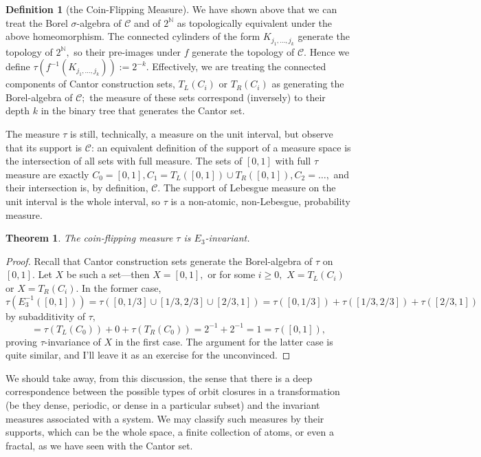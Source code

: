 \documentclass[12pt, letterpaper, oneside]{book}
\newcommand{\gs}{\ensuremath{\sigma}}
\newcommand{\gt}{\ensuremath{\tau}}
\newcommand{\N}{\mathbb{N}}
\theoremstyle{plain}
\newtheorem{theorem}{Theorem}
\theoremstyle{definition}
\newtheorem{definition}{Definition}
\theoremstyle{remark}
\begin{document}
\begin{definition}[the Coin-Flipping Measure]
We have shown above that we can treat the Borel $\gs$-algebra of $\mathcal{C}$ and of $2^\N$ as topologically equivalent under the above homeomorphism. The connected cylinders of the form $K_{j_1,\ldots,j_k}$ generate the topology of $2^\N,$ so their pre-images under $f$ generate the topology of $\mathcal{C}.$ Hence we define $\gt(f^{-1}(K_{j_1,\ldots,j_k})) := 2^{-k}.$ Effectively, we are treating the connected components of Cantor construction sets, $T_L(C_i)$ or $T_R(C_i)$ as generating the Borel-algebra of $\mathcal{C};$ the measure of these sets correspond (inversely) to their depth $k$ in the binary tree that generates the Cantor set. 

The measure $\gt$ is still, technically, a measure on the unit interval, but observe that its support is $\mathcal{C}$: an equivalent definition of the support of a measure space is the intersection of all sets with full measure. The sets of $[0,1]$ with full $\gt$ measure are exactly $C_0 = [0,1], C_1 = T_L([0,1]) \cup T_R([0,1]), C_2 = \ldots,$ and their intersection is, by definition, $\mathcal{C}.$ The support of Lebesgue measure on the unit interval is the whole interval, so $\gt$ is a non-atomic, non-Lebesgue, probability measure. 
\end{definition}

\begin{theorem}
The coin-flipping measure $\gt$ is $E_3$-invariant. 
\end{theorem}
\begin{proof}
Recall that Cantor construction sets generate the Borel-algebra of $\gt$ on $[0,1].$ Let $X$ be such a set---then $X=[0,1],$ or for some $i \geq 0,$ $X = T_L(C_i)$ or $X= T_R(C_i).$ In the former case, 
\[
\gt(E^{-1}_3([0,1])) = \gt([0,1/3] \cup [1/3, 2/3] \cup [2/3, 1]) = \gt([0, 1/3]) + \gt([1/3, 2/3]) + \gt([2/3, 1]) 
\]
by subadditivity of $\gt,$ 
\[
= \gt(T_L(C_0)) + 0 + \gt(T_R(C_0)) = 2^{-1} + 2^{-1} = 1 = \gt([0,1]),
\]
proving $\gt$-invariance of $X$ in the first case. The argument for the latter case is quite similar, and I'll leave it as an exercise for the unconvinced. 
\end{proof}

We should take away, from this discussion, the sense that there is a deep correspondence between the possible types of orbit closures in a transformation (be they dense, periodic, or dense in a particular subset) and the invariant measures associated with a system. We may classify such measures by their supports, which can be the whole space, a finite collection of atoms, or even a fractal, as we have seen with the Cantor set. 
\end{document}
